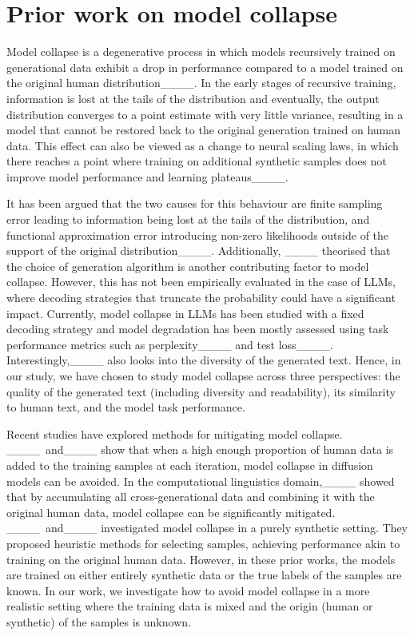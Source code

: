 \section{Prior work on model collapse}
\label{sec:model_collapse}
%
Model collapse is a degenerative process in which models recursively trained on generational data exhibit a drop in performance compared to a model trained on the original human distribution____. In the early stages of recursive training, information is lost at the tails of the distribution and eventually, the output distribution converges to a point estimate with very little variance, resulting in a model that cannot be restored back to the original generation trained on human data. This effect can also be viewed as a change to neural scaling laws, in which there reaches a point where training on additional synthetic samples does not improve model performance and learning plateaus____.

It has been argued that the two causes for this behaviour are finite sampling error leading to information being lost at the tails of the distribution, and functional approximation error introducing non-zero likelihoods outside of the support of the original distribution____. Additionally, ____ theorised that the choice of generation algorithm is another contributing factor to model collapse. However, this has not been empirically evaluated in the case of LLMs, where decoding strategies that truncate the probability could have a significant impact. Currently, model collapse in LLMs has been studied with a fixed decoding strategy and model degradation has been mostly assessed using task performance metrics such as perplexity____ and test loss____. Interestingly,____ also looks into the diversity of the generated text. Hence, in our study, we have chosen to study model collapse across three perspectives: the quality of the generated text (including diversity and readability), its similarity to human text, and the model task performance.

%
Recent studies have explored methods for mitigating model collapse. ____~and____ show that when a high enough proportion of human data is added to the training samples at each iteration, model collapse in diffusion models can be avoided. In the computational linguistics domain,____ showed that by accumulating all cross-generational data and combining it with the original human data, model collapse can be significantly mitigated. ____~and____ investigated model collapse in a purely synthetic setting. They proposed heuristic methods for selecting samples, achieving performance akin to training on the original human data. However, in these prior works, the models are trained on either entirely synthetic data or the true labels of the samples are known. In our work, we investigate how to avoid model collapse in a more realistic setting where the training data is mixed and the origin (human or synthetic) of the samples 
is unknown.